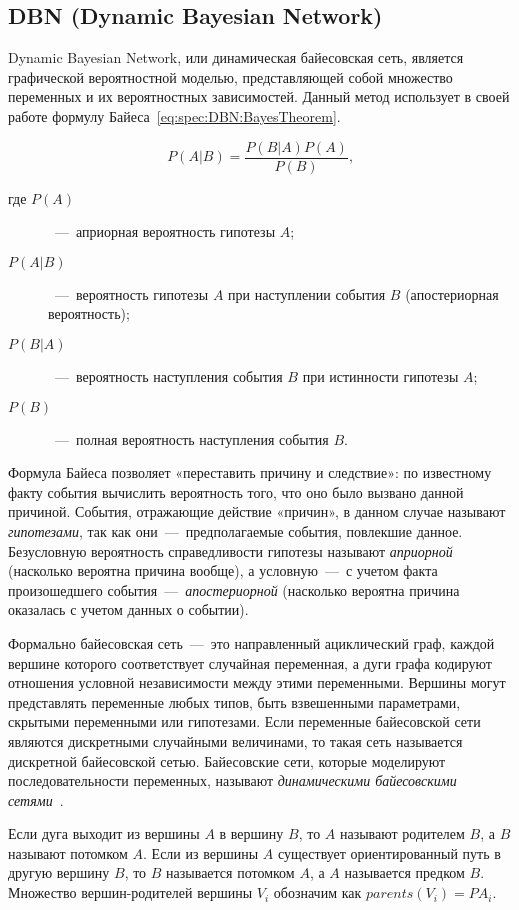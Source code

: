 \subsection{DBN (Dynamic Bayesian Network)}
Dynamic Bayesian Network, или динамическая байесовская сеть, является графической вероятностной моделью, представляющей собой множество переменных и их вероятностных зависимостей. Данный метод использует в своей работе формулу Байеса~\eqref{eq:spec:DBN:BayesTheorem}.

\begin{equation} \label{eq:spec:DBN:BayesTheorem}
P(A|B) = \frac{P(B|A) P(A)}{P(B)} \text{,}
\end{equation}
\begin{description}
	\item[где $P(A)$]~---~априорная вероятность гипотезы $A$;
	\item[$P(A|B)$]~---~вероятность гипотезы $A$ при наступлении события $B$ (апостериорная вероятность);
	\item[$P(B|A)$]~---~вероятность наступления события $B$ при истинности гипотезы $A$;
	\item[$P(B)$]~---~полная вероятность наступления события $B$.
\end{description}

Формула Байеса позволяет «переставить причину и следствие»: по известному факту события вычислить вероятность того, что оно было вызвано данной причиной. События, отражающие действие «причин», в данном случае называют \textit{гипотезами}, так как они~---~предполагаемые события, повлекшие данное. Безусловную вероятность справедливости гипотезы называют \textit{априорной} (насколько вероятна причина вообще), а условную~---~с учетом факта произошедшего события~---~\textit{апостериорной} (насколько вероятна причина оказалась с учетом данных о событии).

Формально байесовская сеть~---~это направленный ациклический граф, каждой вершине которого соответствует случайная переменная, а дуги графа кодируют отношения условной независимости между этими переменными. Вершины могут представлять переменные любых типов, быть взвешенными параметрами, скрытыми переменными или гипотезами. Если переменные байесовской сети являются дискретными случайными величинами, то такая сеть называется дискретной байесовской сетью. Байесовские сети, которые моделируют последовательности переменных, называют \textit{динамическими байесовскими сетями}~\cite{PearlDynamicBayesianNetworks}.

Если дуга выходит из вершины $A$ в вершину $B$, то $A$ называют родителем $B$, а $B$ называют потомком $A$. Если из вершины $A$ существует ориентированный путь в другую вершину $B$, то $B$ называется потомком $A$, а $A$ называется предком $B$. Множество вершин-родителей вершины $V_i$ обозначим как $parents(V_i) = PA_i$.

